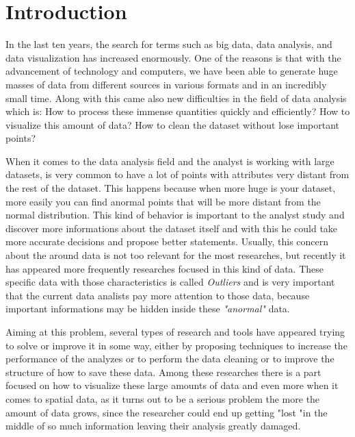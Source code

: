 \chapter{Introduction}


In the last ten years, the search for terms such as big data, data analysis, and
data visualization has increased enormously. One of the reasons is that with the
advancement of technology and computers, we have been able to generate huge masses 
of data from different sources in various formats and in an incredibly small time.
Along with this came also new difficulties in the field of data analysis which is:
How to process these immense quantities quickly and efficiently? How to visualize
this amount of data? How to clean the dataset without lose important points?

When it comes to the data analysis field and the analyst is working with large 
datasets, is very common to have a lot of points with attributes very distant from
the rest of the dataset. This happens because when more huge is your dataset, more
easily you can find anormal points that will be more distant from the normal
distribution. This kind of behavior is important to the analyst study and discover
more informations about the dataset itself and with this he could take more accurate
decisions and propose better statements. Usually, this concern about the around
data is not too relevant for the most researches, but recently it has appeared
more frequently researches focused in this kind of data. These specific data 
with those characteristics is called \textit{Outliers} and is very important that
the current data analists pay more attention to those data, because important
informations may be hidden inside these \textit{"anormal"} data.  


Aiming at this problem, several types of research and tools have appeared trying to
solve or improve it in some way, either by proposing techniques to increase 
the performance of the analyzes or to perform the data cleaning or to improve the 
structure of how to save these data. Among these researches there is a part focused 
on how to visualize these large amounts of data and even more when it comes to 
spatial data, as it turns out to be a serious problem the more the amount of data 
grows, since the researcher could end up getting "lost "in the middle of so much 
information leaving their analysis greatly damaged.

